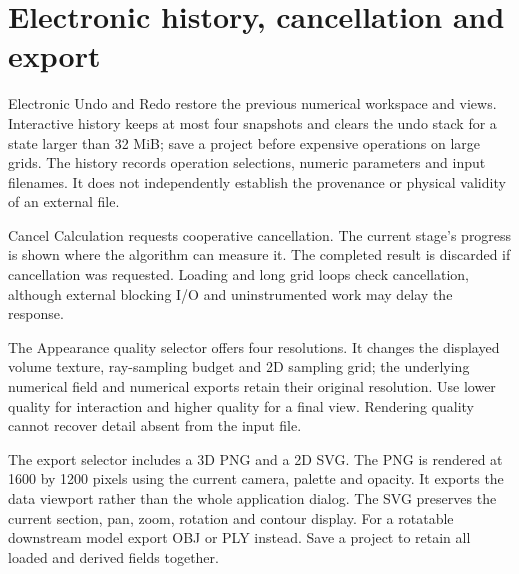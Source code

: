 \section{Electronic history, cancellation and export}
Electronic Undo and Redo restore the previous numerical workspace and views. Interactive history keeps at most four snapshots and clears the undo stack for a state larger than 32 MiB; save a project before expensive operations on large grids. The history records operation selections, numeric parameters and input filenames. It does not independently establish the provenance or physical validity of an external file.

Cancel Calculation requests cooperative cancellation. The current stage's progress is shown where the algorithm can measure it. The completed result is discarded if cancellation was requested. Loading and long grid loops check cancellation, although external blocking I/O and uninstrumented work may delay the response.

The Appearance quality selector offers four resolutions. It changes the displayed volume texture, ray-sampling budget and 2D sampling grid; the underlying numerical field and numerical exports retain their original resolution. Use lower quality for interaction and higher quality for a final view. Rendering quality cannot recover detail absent from the input file.

The export selector includes a 3D PNG and a 2D SVG. The PNG is rendered at 1600 by 1200 pixels using the current camera, palette and opacity. It exports the data viewport rather than the whole application dialog. The SVG preserves the current section, pan, zoom, rotation and contour display. For a rotatable downstream model export OBJ or PLY instead. Save a project to retain all loaded and derived fields together.


